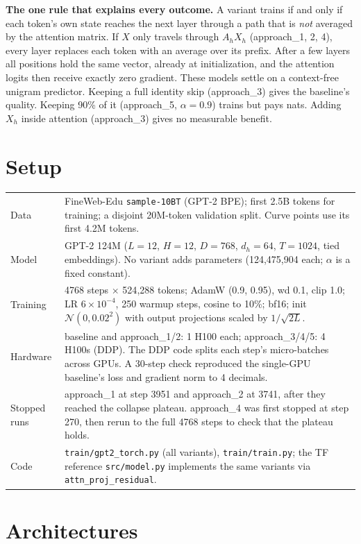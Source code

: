 \documentclass[11pt]{article}
\newcommand{\code}[1]{\texttt{#1}}
\begin{document}
\textbf{The one rule that explains every outcome.} A variant trains if and only if each token's own state
reaches the next layer through a path that is \emph{not} averaged by the attention matrix. If $X$ only
travels through $A_hX_h$ (approach\_1, 2, 4), every layer replaces each token with an average over its
prefix. After a few layers all positions hold the same vector, already at initialization, and the
attention logits then receive exactly zero gradient. These models settle on a context-free unigram
predictor. Keeping a full identity skip (approach\_3) gives the baseline's quality. Keeping 90\% of
it (approach\_5, $\alpha=0.9$) trains but pays \FiveDelta{} nats. Adding $X_h$ inside attention
(approach\_3) gives no measurable benefit.

\section{Setup}
{\small
\begin{tabularx}{\linewidth}{@{}lX@{}}
Data & FineWeb-Edu \code{sample-10BT} (GPT-2 BPE); first 2.5B tokens for training; a disjoint 20M-token
validation split. Curve points use its first 4.2M tokens. \\
Model & GPT-2 124M ($L{=}12$, $H{=}12$, $D{=}768$, $d_h{=}64$, $T{=}1024$, tied embeddings). No variant adds
parameters (124{,}475{,}904 each; $\alpha$ is a fixed constant). \\
Training & 4768 steps $\times$ 524{,}288 tokens; AdamW (0.9, 0.95), wd 0.1, clip 1.0; LR $6{\times}10^{-4}$, 250
warmup steps, cosine to 10\%; bf16; init $\mathcal N(0,0.02^2)$ with output projections scaled by
$1/\sqrt{2L}$. \\
Hardware & baseline and approach\_1/2: 1 H100 each; approach\_3/4/5: 4 H100s (DDP). The DDP code splits each
step's micro-batches across GPUs. A 30-step check reproduced the single-GPU baseline's loss and gradient norm
to 4 decimals. \\
Stopped runs & approach\_1 at step 3951 and approach\_2 at 3741, after they reached the collapse plateau.
approach\_4 was first stopped at step 270, then rerun to the full 4768 steps to check that the plateau holds. \\
Code & \code{train/gpt2\_torch.py} (all variants), \code{train/train.py}; the TF reference
\code{src/model.py} implements the same variants via \code{attn\_proj\_residual}. \\
\end{tabularx}}

\section{Architectures}
\end{document}
